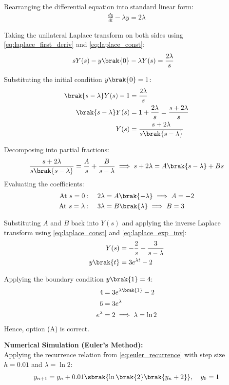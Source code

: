 \begin{enumerate}[label=\thesubsection.\arabic*, ref=\thesubsection.\theenumi]
\solution
Rearranging the differential equation into standard linear form:
\begin{align}
\frac{dy}{dt} - \lambda y = 2\lambda
\end{align}

Taking the unilateral Laplace transform on both sides using \eqref{eq:laplace_first_deriv} and \eqref{eq:laplace_const}:
\begin{align}
s Y(s) - y\brak{0} - \lambda Y(s) &= \frac{2\lambda}{s}
\end{align}

Substituting the initial condition $y\brak{0} = 1$:
\begin{align}
\brak{s - \lambda}Y(s) - 1 &= \frac{2\lambda}{s} \\
\brak{s - \lambda}Y(s) &= 1 + \frac{2\lambda}{s} = \frac{s + 2\lambda}{s} \\
Y(s) &= \frac{s + 2\lambda}{s\brak{s - \lambda}}
\end{align}

Decomposing into partial fractions:
\begin{align}
\frac{s + 2\lambda}{s\brak{s - \lambda}} = \frac{A}{s} + \frac{B}{s - \lambda} \implies s + 2\lambda = A\brak{s - \lambda} + B s
\end{align}
Evaluating the coefficients:
\begin{align}
\text{At } s = 0: \quad 2\lambda &= A\brak{-\lambda} \implies A = -2 \\
\text{At } s = \lambda: \quad 3\lambda &= B\brak{\lambda} \implies B = 3
\end{align}

Substituting $A$ and $B$ back into $Y(s)$ and applying the inverse Laplace transform using \eqref{eq:laplace_const} and \eqref{eq:laplace_exp_inv}:
\begin{align}
Y(s) &= -\frac{2}{s} + \frac{3}{s - \lambda} \\
y\brak{t} &= 3e^{\lambda t} - 2
\end{align}

Applying the boundary condition $y\brak{1} = 4$:
\begin{align}
4 &= 3e^{\lambda\brak{1}} - 2 \\
6 &= 3e^{\lambda} \\
e^{\lambda} &= 2 \implies \lambda = \ln 2
\end{align}
Hence, option (A) is correct.

\noindent\textbf{Numerical Simulation (Euler's Method):} \\
Applying the recurrence relation from \eqref{eq:euler_recurrence} with step size $h = 0.01$ and $\lambda = \ln 2$:
\begin{align}
y_{n+1} = y_n + 0.01\sbrak{\ln\brak{2}\brak{y_n + 2}}, \quad y_0 = 1
\end{align}


\end{enumerate}
